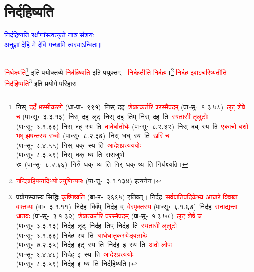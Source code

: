 \section[निर्दहिष्यति]{निर्दहिष्यति}
\centering\textcolor{blue}{निर्दहिष्यति रक्षौघांस्त्वत्कृते नात्र संशयः।\nopagebreak\\
अनुज्ञां देहि मे देवि गच्छामि त्वरयाऽन्वितः॥}\nopagebreak\\
\\
\fontsize{14}{21}\selectfont\begin{sloppypar}\justifying\noindent\hspace{10mm} \textcolor{red}{निर्धक्ष्यति}\footnote{निस्~\textcolor{red}{दहँ भस्मीकरणे} (धा॰पा॰~९९१)~\arrow निस्~दह्~\arrow \textcolor{red}{शेषात्कर्तरि परस्मैपदम्} (पा॰सू॰~१.३.७८)~\arrow \textcolor{red}{लृट् शेषे च} (पा॰सू॰~३.३.१३)~\arrow निस्~दह्~लृट्~\arrow निस्~दह्~तिप्~\arrow निस्~दह्~ति~\arrow \textcolor{red}{स्यतासी लृलुटोः} (पा॰सू॰~३.१.३३)~\arrow निस्~दह्~स्य~ति~\arrow \textcolor{red}{दादेर्धातोर्घः} (पा॰सू॰~८.२.३२)~\arrow निस्~दघ्~स्य~ति~\arrow \textcolor{red}{एकाचो बशो भष् झषन्तस्य स्ध्वोः} (पा॰सू॰~८.२.३७)~\arrow निस्~धघ्~स्य~ति~\arrow \textcolor{red}{खरि च} (पा॰सू॰~८.४.५५)~\arrow निस्~धक्~स्य~ति~\arrow \textcolor{red}{आदेश\-प्रत्यययोः} (पा॰सू॰~८.३.५९)~\arrow निस्~धक्~ष्य~ति~\arrow ससजुषो रुः~\arrow (पा॰सू॰~८.२.६६)~\arrow निरुँ~धक्~ष्य~ति~\arrow निर्~धक्~ष्य~ति~\arrow निर्धक्ष्यति।} इति प्रयोक्तव्ये \textcolor{red}{निर्दहिष्यति} इति प्रयुक्तम्। \textcolor{red}{निर्दहतीति निर्दहः}।\footnote{\textcolor{red}{नन्दि\-ग्रहि\-पचादिभ्यो ल्युणिन्यचः} (पा॰सू॰~३.१.१३४) इत्यनेन।} \textcolor{red}{निर्दह इवाऽचरिष्यतीति निर्दहिष्यति}\footnote{प्रयोगस्यास्य सिद्धिः \textcolor{red}{कृष्णिष्यति} (बा॰म॰~२६६५) इतिवत्। निर्दह~\arrow \textcolor{red}{सर्वप्राति\-पदिकेभ्य आचारे क्विब्वा वक्तव्यः} (वा॰~३.१.११)~\arrow निर्दह~क्विँप्~\arrow निर्दह~व्~\arrow \textcolor{red}{वेरपृक्तस्य} (पा॰सू॰~६.१.६७)~\arrow निर्दह~\arrow \textcolor{red}{सनाद्यन्ता धातवः} (पा॰सू॰~३.१.३२)~\arrow \textcolor{red}{शेषात्कर्तरि परस्मैपदम्} (पा॰सू॰~१.३.७८)~\arrow \textcolor{red}{लृट् शेषे च} (पा॰सू॰~३.३.१३)~\arrow निर्दह~लृट्~\arrow निर्दह~तिप्~\arrow निर्दह~ति~\arrow \textcolor{red}{स्यतासी लृलुटोः} (पा॰सू॰~३.१.३३)~\arrow निर्दह~स्य~ति~\arrow \textcolor{red}{आर्धधातुकस्येड्वलादेः} (पा॰सू॰~७.२.३५)~\arrow निर्दह~इट्~स्य~ति~\arrow निर्दह~इ~स्य~ति~\arrow \textcolor{red}{अतो लोपः} (पा॰सू॰~६.४.४८)~\arrow निर्दह्~इ~स्य~ति~\arrow \textcolor{red}{आदेश\-प्रत्ययोः} (पा॰सू॰~८.३.५९)~\arrow निर्दह्~इ~ष्य~ति~\arrow निर्दहिष्यति।} इति प्रयोगे परिहारः।\end{sloppypar}
